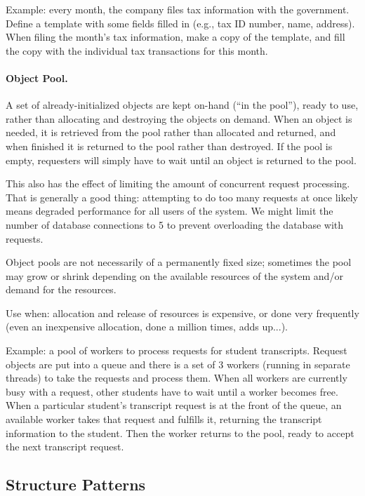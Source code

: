 Example: every month, the company files tax information with the government. Define a template with some fields filled in (e.g., tax ID number, name, address). When filing the month's tax information, make a copy of the template, and fill the copy with the individual tax transactions for this month.

\paragraph{Object Pool.}
A set of already-initialized objects are kept on-hand (``in the pool''), ready to use, rather than allocating and destroying the objects on demand. When an object is needed, it is retrieved from the pool rather than allocated and returned, and when finished it is returned to the pool rather than destroyed. If the pool is empty, requesters will simply have to wait until an object is returned to the pool.

This also has the effect of limiting the amount of concurrent request processing. That is generally a good thing: attempting to do too many requests at once likely means degraded performance for all users of the system. We might limit the number of database connections to 5 to prevent overloading the database with requests.

Object pools are not necessarily of a permanently fixed size; sometimes the pool may grow or shrink depending on the available resources of the system and/or demand for the resources.

Use when: allocation and release of resources is expensive, or done very frequently (even an inexpensive allocation, done a million times, adds up...).

Example: a pool of workers to process requests for student transcripts. Request objects are put into a queue and there is a set of 3 workers (running in separate threads) to take the requests and process them. When all workers are currently busy with a request, other students have to wait until a worker becomes free. When a particular student's transcript request is at the front of the queue, an available worker takes that request and fulfills it, returning the transcript information to the student. Then the worker returns to the pool, ready to accept the next transcript request.

\subsection*{Structure Patterns}

